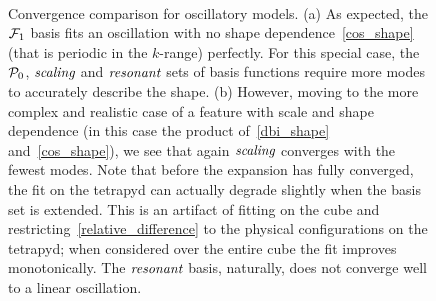 \begin{figure}[!pth]
\centering     %
\\
\caption{
    Convergence comparison for oscillatory models. (a) As expected, the $\mathcal{F}_1$ basis fits an oscillation with
    no shape dependence~\eqref{cos_shape} (that is periodic in the $k$-range) perfectly.
    For this special case, the $\mathcal{P}_0$, $\textit{scaling}$ and $\textit{resonant}$ sets of basis functions require more modes
    to accurately describe the shape. (b) However, moving to the more complex and realistic case of a
    feature with scale and shape dependence (in this case the product of~\eqref{dbi_shape}
    and~\eqref{cos_shape}), we see that again $\textit{scaling}$ converges with the fewest modes.
    Note that before the expansion has fully converged, the fit on the tetrapyd
    can actually degrade slightly when the basis set is extended. This is an artifact
    of fitting on the cube and restricting~\eqref{relative_difference}
    to the physical configurations on the tetrapyd; when considered over the
    entire cube the fit improves monotonically.
    The $\textit{resonant}$ basis, naturally, does not converge well to a linear oscillation.
}\label{fig:recon_osc_dbiosc}
\end{figure}
